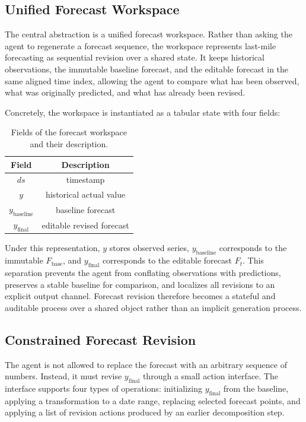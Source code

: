 \documentclass{article}
\theoremstyle{plain}
\theoremstyle{definition}
\theoremstyle{remark}
\begin{document}
\subsection{Unified Forecast Workspace}
The central abstraction is a unified forecast workspace. Rather than asking the agent to regenerate a forecast sequence, the workspace represents last-mile forecasting as sequential revision over a shared state. It keeps historical observations, the immutable baseline forecast, and the editable forecast in the same aligned time index, allowing the agent to compare what has been observed, what was originally predicted, and what has already been revised.

Concretely, the workspace is instantiated as a tabular state with four fields:

\begin{table}[htbp]
\centering
\caption{Fields of
  the forecast workspace and their description.}
\begin{tabular}{@{}cc@{}}
\toprule
\textbf{Field} & \textbf{Description}        \\ \midrule
\(ds\)              & timestamp               \\
\(y\)               & historical actual value \\
\(y_{\text{baseline}}\)      & baseline forecast       \\
\(y_{\text{final}}\)         & editable revised forecast \\ \bottomrule
\end{tabular}
\end{table}

Under this representation, \(y\) stores observed series, $y_{\text{baseline}}$ corresponds to the immutable \(F_{\text{base}}\), and \(y_{\text{final}}\) corresponds to the editable forecast \(F_t\). This separation prevents the agent from conflating observations with predictions, preserves a stable baseline for comparison, and localizes all revisions to an explicit output channel. Forecast revision therefore becomes a stateful and auditable process over a shared object rather than an implicit generation process.

\subsection{Constrained Forecast Revision}
The agent is not allowed to replace the forecast with an arbitrary sequence of numbers. Instead, it must revise \(y_{\text{final}}\) through a small action interface. The interface supports four types of operations: initializing \(y_{\text{final}}\) from the baseline, applying a transformation to a date range, replacing selected forecast points, and applying a list of revision actions produced by an earlier decomposition step.
\end{document}

